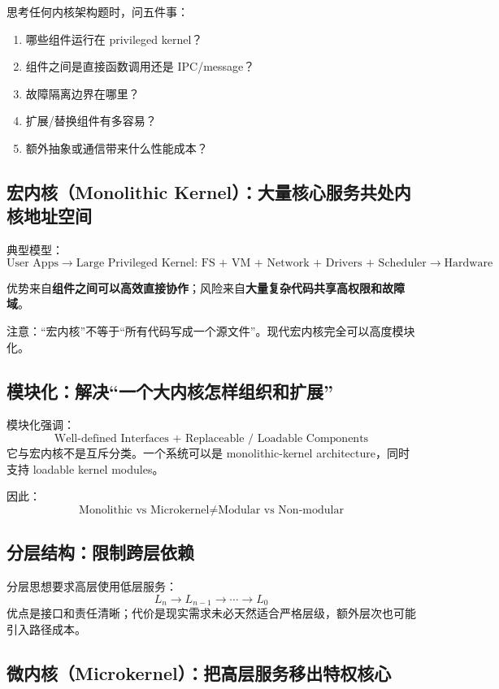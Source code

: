 \documentclass[11pt,a4paper]{ctexart}
\newcommand{\kw}[1]{\textbf{#1}}
\begin{document}
思考任何内核架构题时，问五件事：
\begin{enumerate}
  \item 哪些组件运行在 privileged kernel？
  \item 组件之间是直接函数调用还是 IPC/message？
  \item 故障隔离边界在哪里？
  \item 扩展/替换组件有多容易？
  \item 额外抽象或通信带来什么性能成本？
\end{enumerate}

\subsection{宏内核（Monolithic Kernel）：大量核心服务共处内核地址空间}

典型模型：
\[
\boxed{
\text{User Apps}
\rightarrow
\text{Large Privileged Kernel: FS + VM + Network + Drivers + Scheduler}
\rightarrow
\text{Hardware}
}
\]

优势来自\kw{组件之间可以高效直接协作}；风险来自\kw{大量复杂代码共享高权限和故障域}。

注意：“宏内核”不等于“所有代码写成一个源文件”。现代宏内核完全可以高度模块化。

\subsection{模块化：解决“一个大内核怎样组织和扩展”}

模块化强调：
\[
\boxed{\text{Well-defined Interfaces + Replaceable / Loadable Components}}
\]
它与宏内核不是互斥分类。一个系统可以是 monolithic-kernel architecture，同时支持 loadable kernel modules。

因此：
\[
\boxed{\text{Monolithic vs Microkernel}\neq\text{Modular vs Non-modular}}
\]

\subsection{分层结构：限制跨层依赖}

分层思想要求高层使用低层服务：
\[
L_n\rightarrow L_{n-1}\rightarrow\cdots\rightarrow L_0
\]
优点是接口和责任清晰；代价是现实需求未必天然适合严格层级，额外层次也可能引入路径成本。

\subsection{微内核（Microkernel）：把高层服务移出特权核心}
\end{document}
